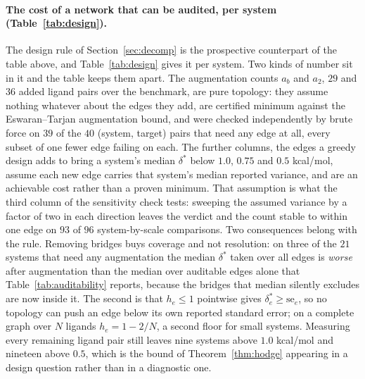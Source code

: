 \paragraph{The cost of a network that can be audited, per system (Table~\ref{tab:design}).} The
design rule of Section~\ref{sec:decomp} is the prospective counterpart of the table above, and
Table~\ref{tab:design} gives it per system. Two kinds of number sit in it and the table keeps them
apart. The augmentation counts $a_b$ and $a_2$, $29$ and $36$ added ligand pairs over the
benchmark, are pure topology: they assume nothing whatever about the edges they add, are certified
minimum against the Eswaran--Tarjan augmentation bound, and were checked independently by brute
force on $39$ of the $40$ (system, target) pairs that need any edge at all, every subset of one
fewer edge failing on each. The further columns, the edges a greedy design adds to bring a system's
median $\delta^\ast$ below $1.0$, $0.75$ and $0.5$ kcal/mol, assume each new edge carries that
system's median reported variance, and are an achievable cost rather than a proven minimum. That
assumption is what the third column of the sensitivity check tests: sweeping the assumed variance
by a factor of two in each direction leaves the verdict and the count stable to within one edge on
$93$ of $96$ system-by-scale comparisons.
Two consequences belong with the rule. Removing bridges buys coverage and not resolution:
on three of the $21$ systems that need any augmentation the median $\delta^\ast$ taken over all
edges is \emph{worse} after augmentation than the median over auditable edges alone that
Table~\ref{tab:auditability} reports, because the bridges that median silently excludes are now
inside it. The second is that $h_e\le1$ pointwise gives $\delta^\ast_e\ge\mathrm{se}_e$, so no
topology can push an edge below its own reported standard error; on a complete graph over $N$ ligands
$h_e=1-2/N$, a second floor for small systems. Measuring every remaining ligand pair still leaves
nine systems above $1.0$ kcal/mol and nineteen above $0.5$, which is the bound of
Theorem~\ref{thm:hodge} appearing in a design question rather than in a diagnostic one.


